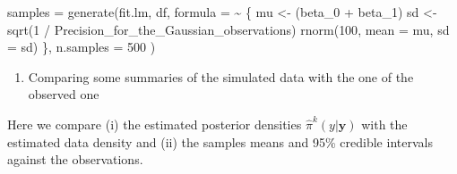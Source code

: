 \documentclass[
  letterpaper,
  DIV=11,
  numbers=noendperiod]{scrartcl}
\newenvironment{Shaded}{\begin{snugshade}}{\end{snugshade}}
\newcommand{\AttributeTok}[1]{\textcolor[rgb]{0.40,0.45,0.13}{#1}}
\newcommand{\DecValTok}[1]{\textcolor[rgb]{0.68,0.00,0.00}{#1}}
\newcommand{\FunctionTok}[1]{\textcolor[rgb]{0.28,0.35,0.67}{#1}}
\newcommand{\NormalTok}[1]{\textcolor[rgb]{0.00,0.23,0.31}{#1}}
\newcommand{\OtherTok}[1]{\textcolor[rgb]{0.00,0.23,0.31}{#1}}
\newcommand{\SpecialCharTok}[1]{\textcolor[rgb]{0.37,0.37,0.37}{#1}}
\providecommand{\tightlist}{%
  \setlength{\itemsep}{0pt}\setlength{\parskip}{0pt}}\usepackage{longtable,booktabs,array}
\begin{document}
\begin{Shaded}
\begin{Highlighting}[]
\NormalTok{samples }\OtherTok{=}  \FunctionTok{generate}\NormalTok{(fit.lm, df,}
  \AttributeTok{formula =} \SpecialCharTok{\textasciitilde{}}\NormalTok{ \{}
\NormalTok{    mu }\OtherTok{\textless{}{-}}\NormalTok{ (beta\_0 }\SpecialCharTok{+}\NormalTok{ beta\_1)}
\NormalTok{    sd }\OtherTok{\textless{}{-}} \FunctionTok{sqrt}\NormalTok{(}\DecValTok{1} \SpecialCharTok{/}\NormalTok{ Precision\_for\_the\_Gaussian\_observations)}
    \FunctionTok{rnorm}\NormalTok{(}\DecValTok{100}\NormalTok{, }\AttributeTok{mean =}\NormalTok{ mu, }\AttributeTok{sd =}\NormalTok{ sd)}
\NormalTok{  \},}
  \AttributeTok{n.samples =} \DecValTok{500}
\NormalTok{) }
\end{Highlighting}
\end{Shaded}

\begin{enumerate}
\def\labelenumi{\arabic{enumi}.}
\setcounter{enumi}{1}
\tightlist
\item
  Comparing some summaries of the simulated data with the one of the
  observed one
\end{enumerate}

Here we compare (i) the estimated posterior densities
\(\hat{\pi}^k(y|\mathbf{y})\) with the estimated data density and (ii)
the samples means and 95\% credible intervals against the observations.
\end{document}
